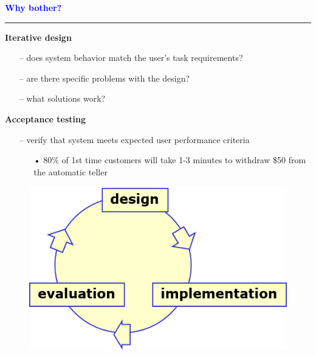 \documentclass[pdf]{beamer}
\begin{document}
{
\begin{frame}
    \textcolor{Blue}{\textbf{\Large{Why bother?}}}
    \textcolor{red}{\rule{10cm}{1mm}}
    
    \textbf{Iterative design}\par
    \begin{itemize}
    \item[\textcolor{black}{--}] does system behavior match the user’s task requirements?
    \item[\textcolor{black}{--}] are there specific problems with the design? 
    \item[\textcolor{black}{--}] what solutions work? 
    \end{itemize}
    	\bigskip
   \textbf{Acceptance testing}\par
    \begin{itemize}
    \item[\textcolor{black}{--}] verify that system meets expected user performance criteria
    \begin{itemize}
    	\item[\textcolor{black}{•}] 80\% of 1st time customers will take 1-3 minutes to  withdraw \$50 from the automatic teller
    \end{itemize}
    \end{itemize}
    \begin{figure}[b]
    	\includegraphics[scale = 0.4, right]{3_4_img.png}
    \end{figure}
\end{frame}}
\end{document}
